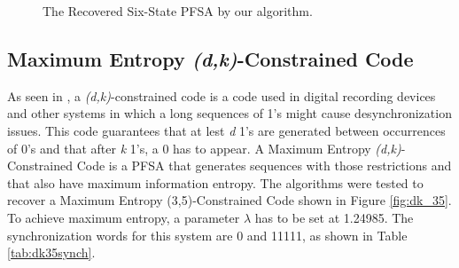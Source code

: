 {\begin{figure}
\centering
{}
\caption{The Recovered Six-State PFSA by our algorithm.\label{fig:sixstatealgo}}
\end{figure}

\subsection{Maximum Entropy \textit{(d,k)}-Constrained Code}

As seen in \cite{immink.98}, a \textit{(d,k)}-constrained code is a code used in digital recording devices and other systems in which a long sequences of 1's might cause desynchronization issues. This code guarantees that at lest \textit{d} 1's are generated between occurrences of 0's and that after \textit{k} 1's, a 0 has to appear. A Maximum Entropy \textit{(d,k)}-Constrained Code is a PFSA that generates sequences with those restrictions and that also have maximum information entropy. The algorithms were tested to recover a Maximum Entropy (3,5)-Constrained Code shown in Figure \ref{fig:dk_35}. To achieve maximum entropy, a parameter $\lambda$ has to be set at 1.24985. The synchronization words for this system are 0 and 11111, as shown in Table \ref{tab:dk35synch}.

}
